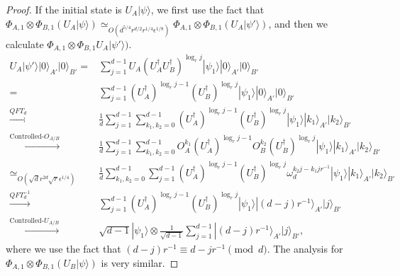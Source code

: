 \documentclass[11pt,letterpaper]{article}
\newcommand{\ket}[1]{|#1\rangle}
\newcommand{\x}{\otimes}
\newcommand{\ct}{^{\dagger}}
\DeclareMathOperator{\spn}{span}
\DeclareMathOperator{\supp}{supp}
\newcommand{\1}{\mathbb{1}}
\newcommand{\ep}{\epsilon}
\newcommand{\qe}{\epsilon^{1/4}}
\newcommand{\sd}{\sqrt{d}}
\newcommand{\sr}{\sqrt{r}}
\newcommand{\appd}[1]{\simeq_{#1}}
\theoremstyle{definition}
\begin{document}
\begin{proof}
If the initial state is $U_A\ket{\psi}$, we first use the fact that 
$ \Phi_{A,1} \x \Phi_{B,1} (U_A\ket{\psi}) \appd{O(d^{5/4}r^{d/2} r^{1/4} \ep^{1/8})}  \Phi_{A,1} \x \Phi_{B,1} (U_A\ket{\psi'})$, 
and then we calculate $\Phi_{A,1} \x \Phi_{B,1} U_A\ket{\psi'})$.
\begin{align}
	U_A \ket{\psi'} \ket{0}_{A'}\ket{0}_{B'} =&  
		\sum_{j=1}^{d-1} U_A(U_A\ct U_B\ct)^{\log_r j}\ket{\psi_1} \ket{0}_{A'}\ket{0}_{B'}\\
		=&\sum_{j=1}^{d-1}(U_A\ct)^{\log_r j-1}  (U_B\ct)^{\log_r j} \ket{\psi_1} \ket{0}_{A'}\ket{0}_{B'}\\
		\xrightarrow[]{QFT_d} &\frac{1}{d}\sum_{j=1}^{d-1} \sum_{k_1,k_2 = 0}^{d-1}(U_A\ct)^{\log_r j-1} (U_B\ct)^{\log_r j} \ket{\psi_1}  \ket{k_1}_{A'}\ket{k_2}_{B'}\\
		\xrightarrow[]{\text{Controlled-}O_{A/B}}&\frac{1}{d}\sum_{j=1}^{d-1}\sum_{k_1,k_2 = 0}^{d-1} 
		 O_A^{k_1}(U_A\ct)^{\log_r j-1} O_B^{k_2}(U_B\ct)^{\log_r j} \ket{\psi_1} \ket{k_1}_{A'}\ket{k_2}_{B'}\\
		\appd{O(\sd r^{2d} \sr \qe)}& \frac{1}{d}\sum_{k_1,k_2 = 0}^{d-1} \sum_{j=1}^{d-1} (U_A\ct)^{\log_r j-1} (U_B\ct)^{\log_r j}
		\omega_d^{k_2j-k_1jr^{-1}}\ket{\psi_1}
		 \ket{k_1}_{A'}\ket{k_2}_{B'}\\
		\xrightarrow[]{QFT_d^{-1}}& \sum_{j=1}^{d-1}  (U_A\ct)^{\log_r j-1} (U_B\ct)^{\log_r j}  
		\ket{\psi_1} \ket{(d-j)r^{-1}}_{A'}\ket{j}_{B'}\\
		\xrightarrow[]{\text{Controlled-}U_{A/B}}& \sqrt{d-1} \ket{\psi_1} \x  
		\frac{1}{\sqrt{d-1}} \sum_{j=1}^{d-1} \ket{(d-j)r^{-1}}_{A'}\ket{j}_{B'},
\end{align}
where we use the fact that $(d-j)r^{-1} \equiv d -jr^{-1} \pmod{d}$.
The analysis for $\Phi_{A,1} \x\Phi_{B,1} (U_B \ket{\psi})$ is very similar.
\end{proof}
\end{document}
